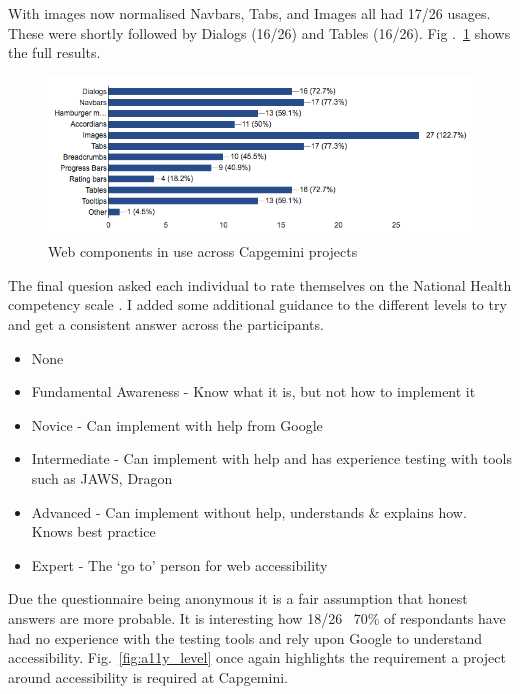 With images now normalised Navbars, Tabs, and Images all had 17/26 usages.
These were shortly followed by Dialogs (16/26) and Tables (16/26). Fig
.~\ref{fig:components_in_use} shows the full results.

\begin{figure}[H]
\centering
\centering
\includegraphics[width=\textwidth]{figures/questions/components_in_use}
\captionsetup{justification=centering}
\caption{Web components in use across Capgemini projects
\label{fig:components_in_use}}
\end{figure}

The final quesion asked each individual to rate themselves on the National
Health competency scale \citep{NHComptency}. I added some additional guidance
to the different levels to try and get a consistent answer across the
participants.
\begin{itemize}
\item None
\item Fundamental Awareness - Know what it is, but not how to implement it
\item Novice - Can implement with help from Google
\item Intermediate - Can implement with help and has experience testing with tools such as JAWS, Dragon
\item Advanced  - Can implement without help, understands \& explains how.
Knows best practice
\item Expert - The `go to' person for web accessibility
\end{itemize}

Due the questionnaire being anonymous it is a fair assumption that honest
answers are more probable. It is interesting how 18/26 ~70\% of respondants
have had no experience with the testing tools and rely upon Google to
understand accessibility. Fig.~\ref{fig:a11y_level} once again highlights
the requirement a project around accessibility is required at Capgemini.

